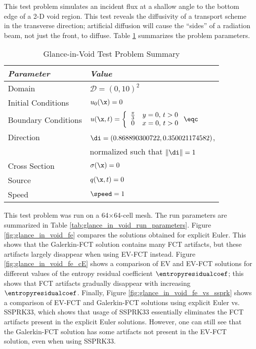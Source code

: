 This test problem simulates an incident flux at a shallow angle to
the bottom edge of a 2-D void region.
This test reveals the diffusivity of a transport scheme in the transverse
direction; artificial diffusion will cause the ``sides'' of a radiation beam,
not just the front, to diffuse.
Table \ref{tab:glance_in_void} summarizes the problem parameters.

\begin{table}[htb]\caption{Glance-in-Void Test Problem Summary}
\label{tab:glance_in_void}
\centering
\begin{tabular}{l l}\toprule
\emph{Parameter} & \emph{Value}\\\midrule
Domain & $\mathcal{D} = (0,10)^2$\\
Initial Conditions & $u_0(\x)=0$\\
Boundary Conditions & $u(\x,t)=\left\{\begin{array}{c c}
  \frac{\pi}{3} & y = 0, \, t > 0\\
  0             & x = 0, \, t > 0
  \end{array}\right. \eqc$\\
Direction & $\di = (0.868890300722,0.350021174582)$,\\
          & normalized such that $\|\di\| = 1$\\
Cross Section & $\sigma(\x)=0$\\
Source & $q(\x,t)=0$\\
Speed & $\speed=1$\\
\bottomrule\end{tabular}
\end{table}

This test problem was run on a 64$\times$64-cell mesh.
The run parameters are summarized in Table \ref{tab:glance_in_void_run_parameters}.
Figure \ref{fig:glance_in_void_fe} compares the solutions obtained
for explicit Euler. This shows that the Galerkin-FCT solution contains
many FCT artifacts, but these artifacts largely disappear when using
EV-FCT instead. Figure \ref{fig:glance_in_void_fe_cE} shows a comparison
of EV and EV-FCT solutions for different values of the
entropy residual coefficient $\entropyresidualcoef$; this shows that FCT
artifacts gradually disappear with increasing $\entropyresidualcoef$.
Finally, Figure \ref{fig:glance_in_void_fe_vs_ssprk} shows a comparison
of EV-FCT and Galerkin-FCT solutions using explicit Euler vs. SSPRK33,
which shows that usage of SSPRK33 essentially eliminates the FCT artifacts
present in the explicit Euler solutions. However, one can still see that
the Galerkin-FCT solution has some artifacts not present in the EV-FCT
solution, even when using SSPRK33.

